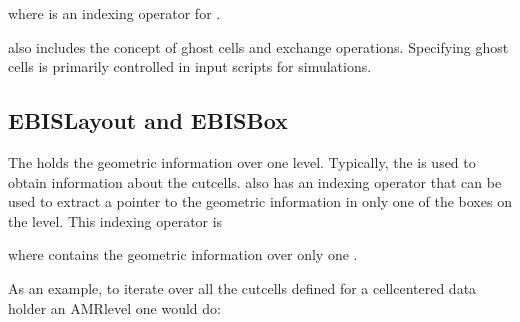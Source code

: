 \documentclass[letterpaper,10pt,english]{sphinxmanual}
\begin{document}
where \sphinxcode{\sphinxupquote{{[}DataIndex{]}}} is an indexing operator for .

 also includes the concept of ghost cells and exchange operations.
Specifying ghost cells is primarily controlled in input scripts for simulations.


\subsection{EBISLayout and EBISBox}
\label{\detokenize{Basics:ebislayout-and-ebisbox}}
The  holds the geometric information over one  level.
Typically, the  is used to obtain information about the cut\sphinxhyphen{}cells.
 also has an indexing operator that can be used to extract a pointer to the geometric information in only one of the boxes on the level.
This indexing operator is

\begin{sphinxVerbatim}[commandchars=\\\{\},formatcom=\scriptsize]
 
      
       

      \PYG{p}{[}\PYG{p}{]}
\end{sphinxVerbatim}

where  contains the geometric information over only one .

As an example, to iterate over all the cut\sphinxhyphen{}cells defined for a cell\sphinxhyphen{}centered data holder an AMR\sphinxhyphen{}level one would do:
\end{document}
